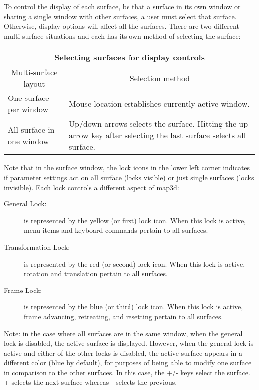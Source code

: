 To control the display of each surface, be that a surface in its own window
or sharing a single window with other surfaces, a user must select that
surface.  Otherwise, display options will affect all the surfaces.  There
are two different multi-surface situations and each has its own method of
selecting the surface:
%
\begin{center}
  \begin{tabular}{|l|p{3in}|}\hline
    \multicolumn{2}{|c|}{Selecting surfaces for display controls} \\ \hline
    \multicolumn{1}{|c|}{Multi-surface layout} & 
    \multicolumn{1}{c|}{Selection method} \\ \hline
    One surface per window & Mouse location establishes currently active
    window. \\
    All surface in one window & Up/down arrows selects the surface.  Hitting
    the up-arrow key after selecting the last surface selects all surface. \\
    \hline 
  \end{tabular}
\end{center}

Note that in the surface window, the lock icons in the lower left corner
indicates if parameter settings act on all surface (locks visible) or just
single surfaces (locks invisible). Each lock controls a different aspect of 
map3d:

\begin{description}
  \item [General Lock:] is represented by the yellow (or first) lock icon.  
	When this lock is active, menu items and keyboard commands pertain 
	to all surfaces.
  \item [Transformation Lock: ] is represented by the red (or second) 
	lock icon.  When this lock is active, rotation and translation 
	pertain to all surfaces.
  \item [Frame Lock: ] is represented by the blue (or third) lock icon.
	When this lock is active, frame advancing, retreating, and resetting
	pertain to all surfaces.
\end{description}

Note: in the case where all surfaces are in the same window, when the general
lock is disabled, the active surface is displayed.  However, when the general 
lock is active and either of the other locks is disabled, the active surface
appears in a different color (blue by default), for purposes of being able to
modify one surface in comparison to the other surfaces. In this case, the +/-
keys select the surface.  + selects the next surface whereas - selects the 
previous.



